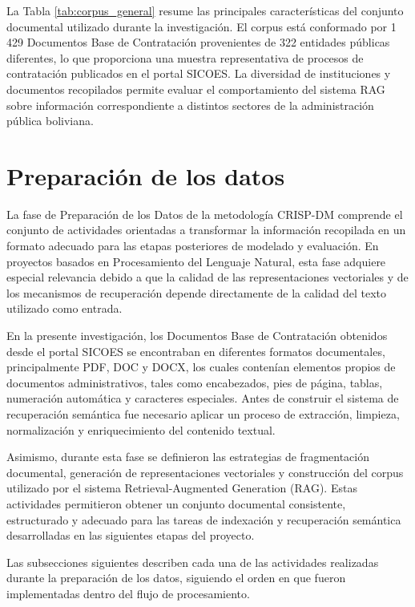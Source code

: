 La Tabla \ref{tab:corpus_general} resume las principales características del conjunto documental utilizado durante la investigación. El corpus está conformado por 1\,429 Documentos Base de Contratación provenientes de 322 entidades públicas diferentes, lo que proporciona una muestra representativa de procesos de contratación publicados en el portal SICOES. La diversidad de instituciones y documentos recopilados permite evaluar el comportamiento del sistema RAG sobre información correspondiente a distintos sectores de la administración pública boliviana.


\section{Preparación de los datos}

La fase de Preparación de los Datos de la metodología CRISP-DM comprende el conjunto de actividades orientadas a transformar la información recopilada en un formato adecuado para las etapas posteriores de modelado y evaluación. En proyectos basados en Procesamiento del Lenguaje Natural, esta fase adquiere especial relevancia debido a que la calidad de las representaciones vectoriales y de los mecanismos de recuperación depende directamente de la calidad del texto utilizado como entrada.

En la presente investigación, los Documentos Base de Contratación obtenidos desde el portal SICOES se encontraban en diferentes formatos documentales, principalmente PDF, DOC y DOCX, los cuales contenían elementos propios de documentos administrativos, tales como encabezados, pies de página, tablas, numeración automática y caracteres especiales. Antes de construir el sistema de recuperación semántica fue necesario aplicar un proceso de extracción, limpieza, normalización y enriquecimiento del contenido textual.

Asimismo, durante esta fase se definieron las estrategias de fragmentación documental, generación de representaciones vectoriales y construcción del corpus utilizado por el sistema Retrieval-Augmented Generation (RAG). Estas actividades permitieron obtener un conjunto documental consistente, estructurado y adecuado para las tareas de indexación y recuperación semántica desarrolladas en las siguientes etapas del proyecto.

Las subsecciones siguientes describen cada una de las actividades realizadas durante la preparación de los datos, siguiendo el orden en que fueron implementadas dentro del flujo de procesamiento.

